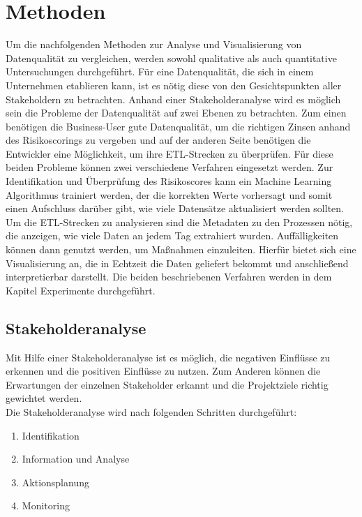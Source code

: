\chapter{Methoden}\label{ch:method}
Um die nachfolgenden Methoden zur Analyse und Visualisierung von Datenqualität zu vergleichen, werden sowohl qualitative als auch quantitative Untersuchungen durchgeführt.
Für eine Datenqualität, die sich in einem Unternehmen etablieren kann, ist es nötig diese von den Gesichtspunkten aller Stakeholdern zu betrachten.
Anhand einer Stakeholderanalyse wird es möglich sein die Probleme der Datenqualität auf zwei Ebenen zu betrachten. 
Zum einen benötigen die Business-User gute Datenqualität, um die richtigen Zinsen anhand des Risikoscorings zu vergeben und auf der anderen Seite benötigen die Entwickler eine Möglichkeit, um ihre ETL-Strecken zu überprüfen.
Für diese beiden Probleme können zwei verschiedene Verfahren eingesetzt werden.
Zur Identifikation und Überprüfung des Risikoscores kann ein Machine Learning Algorithmus trainiert werden, der die korrekten Werte vorhersagt und somit einen Aufschluss darüber gibt, wie viele Datensätze aktualisiert werden sollten.
Um die ETL-Strecken zu analysieren sind die Metadaten zu den Prozessen nötig, die anzeigen, wie viele Daten an jedem Tag extrahiert wurden. 
Auffälligkeiten können dann genutzt werden, um Maßnahmen einzuleiten.
Hierfür bietet sich eine Visualisierung an, die in Echtzeit die Daten geliefert bekommt und anschließend interpretierbar darstellt.
Die beiden beschriebenen Verfahren werden in dem Kapitel Experimente durchgeführt. 



\section{Stakeholderanalyse}
Mit Hilfe einer Stakeholderanalyse ist es möglich, die negativen Einflüsse zu erkennen und die positiven Einflüsse zu nutzen.
Zum Anderen können die Erwartungen der einzelnen Stakeholder erkannt und die Projektziele richtig gewichtet werden. \\
Die Stakeholderanalyse wird nach folgenden Schritten durchgeführt: 

\begin{enumerate}
 \item Identifikation
 \item Information und Analyse 
 \item Aktionsplanung
 \item Monitoring
\end{enumerate}

